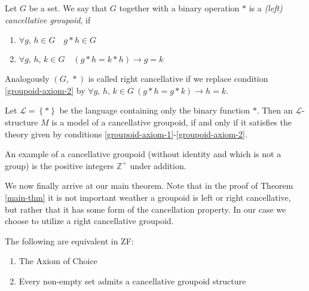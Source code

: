\documentclass[../../main.tex]{subfiles}
\begin{document}
\begin{definition}[Groupoid]
    Let $G$ be a set.
    We say that $G$ together with a binary operation $*$ is a \emph{(left) cancellative groupoid}, if 
    \begin{enumerate}[label=(\roman*)]
        \item \label{groupoid-axiom-1} $\forall g,\, h \in G \quad g * h \in G$
        \item \label{groupoid-axiom-2} $\forall g,\, h,\, k \in G \quad \left(g * h = k * h\right) \rightarrow g = k$
    \end{enumerate}
    Analogously $\left(G,\, *\right)$ is called right cancellative if we replace condition \ref{groupoid-axiom-2} by
    $\forall g,\, h,\, k \in G \ \left(g * h = g * k\right) \rightarrow h = k$.

    Let $\mathcal{L} = \left\{*\right\}$ be the language containing only the binary function $*$.
    Then an $\mathcal{L}$-structure $M$ is a model of a cancellative groupoid, 
    if and only if it satisfies the theory given by conditions \ref{groupoid-axiom-1}-\ref{groupoid-axiom-2}.
\end{definition}
An example of a cancellative groupoid (without identity and which is not a group) is the positive integers $\mathbb{Z}^+$ under addition.

We now finally arrive at our main theorem.
Note that in the proof of Theorem \ref{main-thm} it is not important weather a groupoid is left or right cancellative,
but rather that it has some form of the cancellation property.
In our case we choose to utilize a right cancellative groupoid.

\begin{theorem}\cite{Haj72}\label{main-thm}
    The following are equivalent in ZF:
    \begin{enumerate}
        \item The Axiom of Choice
        \item Every non-empty set admits a cancellative groupoid structure
    \end{enumerate}
\end{theorem}
\end{document}
